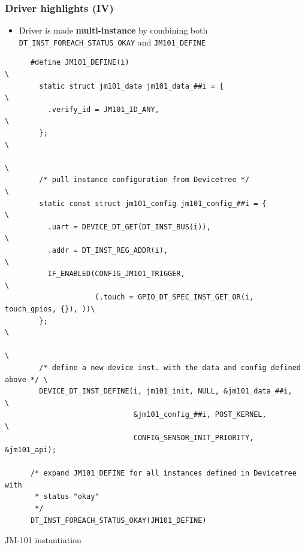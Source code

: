 \documentclass[handout]{beamer}
\begin{document}
\begin{frame}[fragile]
  \frametitle{Driver highlights (IV)}

  \begin{itemize}
    \item Driver is made \textbf{multi-instance} by combining both
          \texttt{DT\_INST\_FOREACH\_STATUS\_OKAY} and \texttt{JM101\_DEFINE}
  \end{itemize}

  \begin{listing}[H]
    \begin{verbatim}
      #define JM101_DEFINE(i)                                                  \
        static struct jm101_data jm101_data_##i = {                            \
          .verify_id = JM101_ID_ANY,                                           \
        };                                                                     \
                                                                               \
        /* pull instance configuration from Devicetree */                      \
        static const struct jm101_config jm101_config_##i = {                  \
          .uart = DEVICE_DT_GET(DT_INST_BUS(i)),                               \
          .addr = DT_INST_REG_ADDR(i),                                         \
          IF_ENABLED(CONFIG_JM101_TRIGGER,                                     \
                     (.touch = GPIO_DT_SPEC_INST_GET_OR(i, touch_gpios, {}), ))\
        };                                                                     \
                                                                               \
        /* define a new device inst. with the data and config defined above */ \
        DEVICE_DT_INST_DEFINE(i, jm101_init, NULL, &jm101_data_##i,            \
                              &jm101_config_##i, POST_KERNEL,                  \
                              CONFIG_SENSOR_INIT_PRIORITY, &jm101_api);

      /* expand JM101_DEFINE for all instances defined in Devicetree with
       * status "okay"
       */
      DT_INST_FOREACH_STATUS_OKAY(JM101_DEFINE)
    \end{verbatim}
    \caption{JM-101 instantiation}
  \end{listing}
\end{frame}
\end{document}
